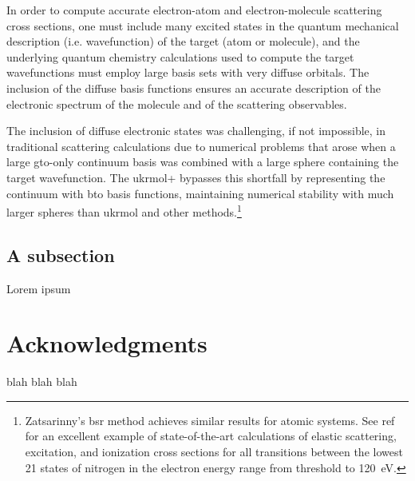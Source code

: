 \documentclass[12pt]{article}
\begin{document}
In order to compute accurate electron-atom and electron-molecule scattering cross sections, 
one must include many excited states in the quantum mechanical description (i.e. wavefunction) 
of the target (atom or molecule), and the underlying quantum chemistry calculations used to 
compute the target wavefunctions must employ large basis sets with very diffuse orbitals. 
The inclusion of the diffuse basis functions ensures an accurate description of the 
electronic spectrum of the molecule and of the scattering observables.\cite{Darby_Lewis_2017}

The inclusion of diffuse electronic states was challenging, if not impossible, in traditional 
\rmat{} scattering calculations due to numerical problems that arose when a large \ac{gto}-only 
continuum basis was combined with a large \rmat{} sphere containing the target wavefunction.
The \ac{ukrmol+} bypasses this shortfall by representing the continuum with \ac{bto} basis functions,
maintaining numerical stability with much larger \rmat{} spheres than \ac{ukrmol} and other \rmat
methods.\footnote{Zatsarinny's \ac{bsr} method achieves similar results for atomic systems. See 
ref~\cite{PhysRevA.89.062714} for an excellent example of state-of-the-art calculations of 
elastic scattering, excitation, and ionization cross sections for all transitions between 
the lowest 21 states of nitrogen in the electron energy range from threshold to 120~eV.}

\subsection{A subsection}
Lorem ipsum

\section{Acknowledgments}
blah blah blah


{}

\end{document}
